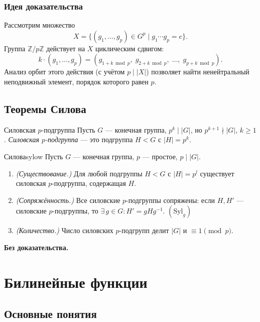\subsubsection*{Идея доказательства}

Рассмотрим множество
\[
X = \{(g_1, \ldots, g_p) \in G^p \mid g_1 \cdots g_p = e\}.
\]
Группа $\mathbb{Z}/p\mathbb{Z}$ действует на $X$ циклическим сдвигом:
\[
k \cdot (g_1, \ldots, g_p) = (g_{1+k \bmod p},\; g_{2+k \bmod p},\; \ldots,\; g_{p+k \bmod p}).
\]
Анализ орбит этого действия (с учётом $p \mid |X|$) позволяет найти ненейтральный неподвижный элемент, порядок которого равен $p$.

\subsection{Теоремы Силова}

\begin{Definition}{Силовская $p$-подгруппа}{}
	Пусть $G$ — конечная группа, $p^k \mid |G|$, но $p^{k+1} \nmid |G|$, $k \geq 1$.
	\textit{Силовская $p$-подгруппа} — это подгруппа $H < G$ с $|H| = p^k$.
\end{Definition}

\begin{Theorem}{Силова}{sylow}
	Пусть $G$ — конечная группа, $p$ — простое, $p \mid |G|$.
	\begin{enumerate}
		\item \textit{(Существование.)} Для любой подгруппы $H < G$ с $|H| = p^l$ существует силовская $p$-подгруппа, содержащая $H$.
		\item \textit{(Сопряжённость.)} Все силовские $p$-подгруппы сопряжены: если $H, H'$ — силовские $p$-подгруппы, то $\exists\, g \in G\colon H' = gHg^{-1}$. \quad $(\mathrm{Syl}_g)$
		\item \textit{(Количество.)} Число силовских $p$-подгрупп делит $|G|$ и $\equiv 1 \pmod{p}$.
	\end{enumerate}
\end{Theorem}

\textbf{Без доказательства.}

\section*{Билинейные функции}

\subsection{Основные понятия}

